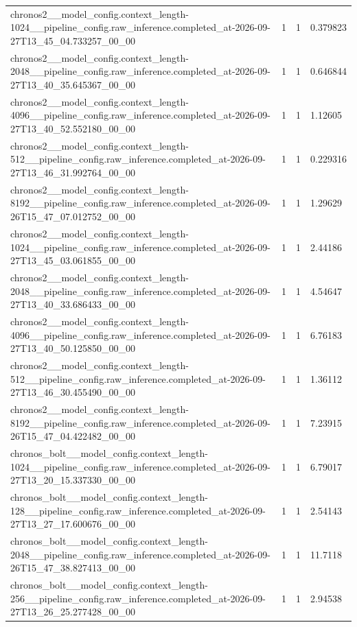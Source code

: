 \begin{tabular}{llll}
chronos2\_\_model\_config.context\_length-1024\_\_pipeline\_config.raw\_inference.completed\_at-2026-09-27T13\_45\_04.733257\_00\_00 & 1 & 1 & 0.379823 \\
chronos2\_\_model\_config.context\_length-2048\_\_pipeline\_config.raw\_inference.completed\_at-2026-09-27T13\_40\_35.645367\_00\_00 & 1 & 1 & 0.646844 \\
chronos2\_\_model\_config.context\_length-4096\_\_pipeline\_config.raw\_inference.completed\_at-2026-09-27T13\_40\_52.552180\_00\_00 & 1 & 1 & 1.12605 \\
chronos2\_\_model\_config.context\_length-512\_\_pipeline\_config.raw\_inference.completed\_at-2026-09-27T13\_46\_31.992764\_00\_00 & 1 & 1 & 0.229316 \\
chronos2\_\_model\_config.context\_length-8192\_\_pipeline\_config.raw\_inference.completed\_at-2026-09-26T15\_47\_07.012752\_00\_00 & 1 & 1 & 1.29629 \\
chronos2\_\_model\_config.context\_length-1024\_\_pipeline\_config.raw\_inference.completed\_at-2026-09-27T13\_45\_03.061855\_00\_00 & 1 & 1 & 2.44186 \\
chronos2\_\_model\_config.context\_length-2048\_\_pipeline\_config.raw\_inference.completed\_at-2026-09-27T13\_40\_33.686433\_00\_00 & 1 & 1 & 4.54647 \\
chronos2\_\_model\_config.context\_length-4096\_\_pipeline\_config.raw\_inference.completed\_at-2026-09-27T13\_40\_50.125850\_00\_00 & 1 & 1 & 6.76183 \\
chronos2\_\_model\_config.context\_length-512\_\_pipeline\_config.raw\_inference.completed\_at-2026-09-27T13\_46\_30.455490\_00\_00 & 1 & 1 & 1.36112 \\
chronos2\_\_model\_config.context\_length-8192\_\_pipeline\_config.raw\_inference.completed\_at-2026-09-26T15\_47\_04.422482\_00\_00 & 1 & 1 & 7.23915 \\
chronos\_bolt\_\_model\_config.context\_length-1024\_\_pipeline\_config.raw\_inference.completed\_at-2026-09-27T13\_20\_15.337330\_00\_00 & 1 & 1 & 6.79017 \\
chronos\_bolt\_\_model\_config.context\_length-128\_\_pipeline\_config.raw\_inference.completed\_at-2026-09-27T13\_27\_17.600676\_00\_00 & 1 & 1 & 2.54143 \\
chronos\_bolt\_\_model\_config.context\_length-2048\_\_pipeline\_config.raw\_inference.completed\_at-2026-09-26T15\_47\_38.827413\_00\_00 & 1 & 1 & 11.7118 \\
chronos\_bolt\_\_model\_config.context\_length-256\_\_pipeline\_config.raw\_inference.completed\_at-2026-09-27T13\_26\_25.277428\_00\_00 & 1 & 1 & 2.94538 \\

\end{tabular}

